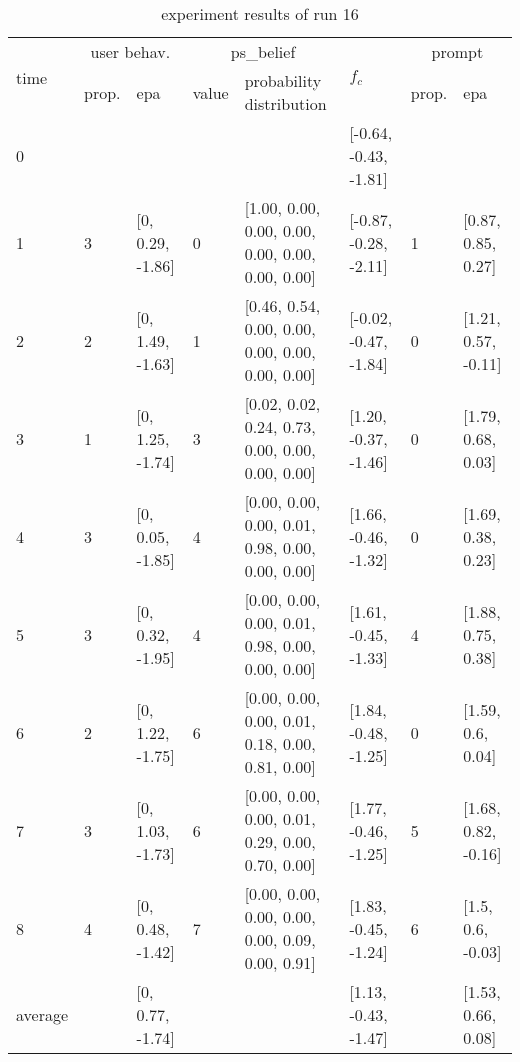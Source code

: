 \begin{table}[htbp]\footnotesize
\caption{experiment results of run 16}
\begin{tabular}{|p{0.4cm}|p{0.6cm}|l|p{0.6cm}|p{3.3cm}|l|p{0.6cm}|l|}
\hline

\multirow{2}{*}{time} & \multicolumn{2}{c|}{user behav.} & \multicolumn{2}{c|}{ps\_belief} &
\multirow{2}{*}{$f_c$} & \multicolumn{2}{c|}{prompt} \\ \cline{2-5}\cline{ 7- 8}
& prop. & epa & value & probability distribution &  & prop. & epa \\ \hline

0 & \multicolumn{1}{l|}{} &  & \multicolumn{1}{l|}{} &  & [-0.64, -0.43, -1.81] & \multicolumn{1}{l|}{} &  \\ \hline
1 & 3 & [0, 0.29, -1.86] & 0 & [1.00, 0.00, 0.00, 0.00, 0.00, 0.00, 0.00, 0.00] & [-0.87, -0.28, -2.11] & 1 & [0.87, 0.85, 0.27] \\ \hline
2 & 2 & [0, 1.49, -1.63] & 1 & [0.46, 0.54, 0.00, 0.00, 0.00, 0.00, 0.00, 0.00] & [-0.02, -0.47, -1.84] & 0 & [1.21, 0.57, -0.11] \\ \hline
3 & 1 & [0, 1.25, -1.74] & 3 & [0.02, 0.02, 0.24, 0.73, 0.00, 0.00, 0.00, 0.00] & [1.20, -0.37, -1.46] & 0 & [1.79, 0.68, 0.03] \\ \hline
4 & 3 & [0, 0.05, -1.85] & 4 & [0.00, 0.00, 0.00, 0.01, 0.98, 0.00, 0.00, 0.00] & [1.66, -0.46, -1.32] & 0 & [1.69, 0.38, 0.23] \\ \hline
5 & 3 & [0, 0.32, -1.95] & 4 & [0.00, 0.00, 0.00, 0.01, 0.98, 0.00, 0.00, 0.00] & [1.61, -0.45, -1.33] & 4 & [1.88, 0.75, 0.38] \\ \hline
6 & 2 & [0, 1.22, -1.75] & 6 & [0.00, 0.00, 0.00, 0.01, 0.18, 0.00, 0.81, 0.00] & [1.84, -0.48, -1.25] & 0 & [1.59, 0.6, 0.04] \\ \hline
7 & 3 & [0, 1.03, -1.73] & 6 & [0.00, 0.00, 0.00, 0.01, 0.29, 0.00, 0.70, 0.00] & [1.77, -0.46, -1.25] & 5 & [1.68, 0.82, -0.16] \\ \hline
8 & 4 & [0, 0.48, -1.42] & 7 & [0.00, 0.00, 0.00, 0.00, 0.00, 0.09, 0.00, 0.91] & [1.83, -0.45, -1.24] & 6 & [1.5, 0.6, -0.03] \\ \hline
\multicolumn{1}{|l|}{average} & \multicolumn{1}{l|}{} & [0, 0.77, -1.74] & \multicolumn{1}{l|}{} &  & [1.13, -0.43, -1.47] & \multicolumn{1}{l|}{} & [1.53, 0.66, 0.08] \\ \hline
\end{tabular}
\label{}
\end{table}


